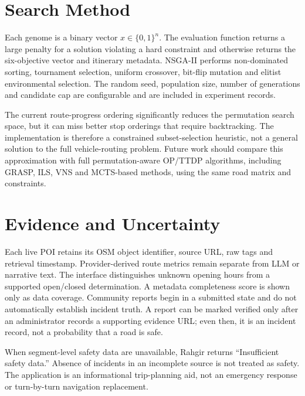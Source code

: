 \documentclass[10pt,conference]{IEEEtran}
\begin{document}
\section{Search Method}
Each genome is a binary vector $x\in\{0,1\}^n$. The evaluation function returns a large penalty for a solution violating a hard constraint and otherwise returns the six-objective vector and itinerary metadata. NSGA-II performs non-dominated sorting, tournament selection, uniform crossover, bit-flip mutation and elitist environmental selection. The random seed, population size, number of generations and candidate cap are configurable and are included in experiment records.

The current route-progress ordering significantly reduces the permutation search space, but it can miss better stop orderings that require backtracking. The implementation is therefore a constrained subset-selection heuristic, not a general solution to the full vehicle-routing problem. Future work should compare this approximation with full permutation-aware OP/TTDP algorithms, including GRASP, ILS, VNS and MCTS-based methods, using the same road matrix and constraints.

\section{Evidence and Uncertainty}
Each live POI retains its OSM object identifier, source URL, raw tags and retrieval timestamp. Provider-derived route metrics remain separate from LLM or narrative text. The interface distinguishes unknown opening hours from a supported open/closed determination. A metadata completeness score is shown only as data coverage. Community reports begin in a submitted state and do not automatically establish incident truth. A report can be marked verified only after an administrator records a supporting evidence URL; even then, it is an incident record, not a probability that a road is safe.

When segment-level safety data are unavailable, Rahgir returns ``Insufficient safety data.'' Absence of incidents in an incomplete source is not treated as safety. The application is an informational trip-planning aid, not an emergency response or turn-by-turn navigation replacement.
\end{document}
